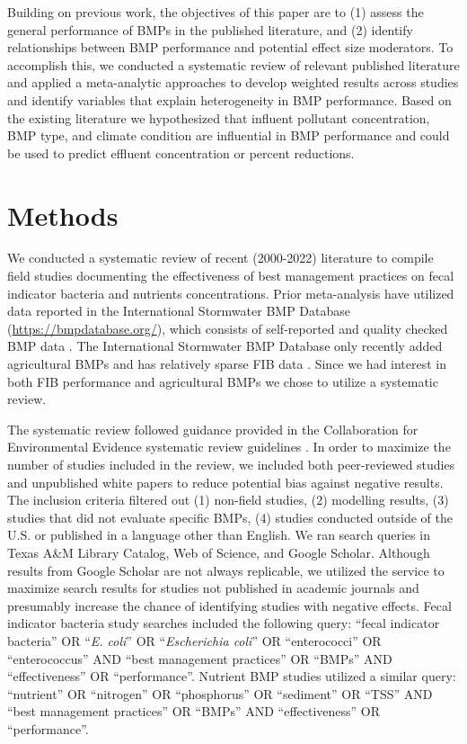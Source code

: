 \documentclass[utf8]{FrontiersinHarvard}
\begin{document}
Building on previous work, the objectives of this paper are to (1) assess the general performance of BMPs in the published literature, and (2) identify relationships between BMP performance and potential effect size moderators.
To accomplish this, we conducted a systematic review of relevant published literature and applied a meta-analytic approaches to develop weighted results across studies and identify variables that explain heterogeneity in BMP performance.
Based on the existing literature we hypothesized that influent pollutant concentration, BMP type, and climate condition are influential in BMP performance and could be used to predict effluent concentration or percent reductions.

\hypertarget{methods}{%
\section{Methods}\label{methods}}

We conducted a systematic review of recent (2000-2022) literature to compile field studies documenting the effectiveness of best management practices on fecal indicator bacteria and nutrients concentrations.
Prior meta-analysis have utilized data reported in the International Stormwater BMP Database (\url{https://bmpdatabase.org/}), which consists of self-reported and quality checked BMP data \citep{claryBMPPerformanceAnalysis2011, kochNitrogenRemovalStormwater2014, horvathEffectsRegionalClimate2023}.
The International Stormwater BMP Database only recently added agricultural BMPs and has relatively sparse FIB data \citep{claryBMPPerformanceAnalysis2011, kochNitrogenRemovalStormwater2014}.
Since we had interest in both FIB performance and agricultural BMPs we chose to utilize a systematic review.

The systematic review followed guidance provided in the Collaboration for Environmental Evidence systematic review guidelines \citep{collaborationforenvironmentalevidenceGuidelinesStandardsEvidence2018}.
In order to maximize the number of studies included in the review, we included both peer-reviewed studies and unpublished white papers to reduce potential bias against negative results.
The inclusion criteria filtered out (1) non-field studies, (2) modelling results, (3) studies that did not evaluate specific BMPs, (4) studies conducted outside of the U.S. or published in a language other than English.
We ran search queries in Texas A\&M Library Catalog, Web of Science, and Google Scholar.
Although results from Google Scholar are not always replicable, we utilized the service to maximize search results for studies not published in academic journals and presumably increase the chance of identifying studies with negative effects.
Fecal indicator bacteria study searches included the following query: ``fecal indicator bacteria'' OR ``\emph{E. coli}'' OR ``\emph{Escherichia coli}'' OR ``enterococci'' OR ``enterococcus'' AND ``best management practices'' OR ``BMPs'' AND ``effectiveness'' OR ``performance''. Nutrient BMP studies utilized a similar query: ``nutrient'' OR ``nitrogen'' OR ``phosphorus'' OR ``sediment'' OR ``TSS'' AND ``best management practices'' OR ``BMPs'' AND ``effectiveness'' OR ``performance''.
\end{document}
